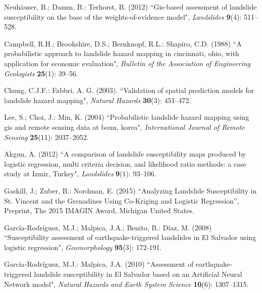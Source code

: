 \documentclass[11pt,twoside]{rmta2010eng}%
\begin{document}
\begin{thebibliography}{99}
  
Neuh\"auser, B.; Damm, B.: Terhorst, B. (2012)
``Gis-based assessment of landslide susceptibility on the base of the
  weights-of-evidence model", 
{\it Landslides} {\bf 9}(4): 511--528.
  
 

 

Campbell, R.H.; Brookshire, D.S.; Bernknopf, R.L.: Shapiro, C.D. (1988)
``A probabilistic approach to landslide hazard mapping in cincinnati,
  ohio, with application for economic evaluation", 
{\it Bulletin of the Association of Engineering Geologists} {\bf 25}(1): 39--56.
  


Chung, C.J.F.: Fabbri, A. G. (2003).
``Validation of spatial prediction models for landslide hazard mapping", 
{\it Natural Hazards} {\bf 30}(3): 451--472.
  


  

Lee, S.; Choi, J.: Min, K. (2004)
``Probabilistic landslide hazard mapping using gis and remote sensing
  data at boun, korea", 
{\it International Journal of Remote Sensing} {\bf 25}(11): 2037--2052.

  

Akgun, A. (2012) 
``A comparison of landslide susceptibility maps produced by logistic regression, multi criteria decision, and likelihood ratio methods: a case study at Izmir, Turkey", 
{\it Landslides} {\bf 9}(1): 93--106.
  


Gaskill, J.; Zuber, B.: Nordman, E. (2015)
``Analyzing Landslide Susceptibility in St. Vincent and the Grenadines Using Co-Kriging and Logistic Regression'', 
Preprint, The 2015 IMAGIN Award, Michigan United States.




Garc\'{i}a-Rodr\'{i}guez, M.J.; Malpica, J.A.; Benito, B.: D\'{i}az, M. (2008) 
``Susceptibility assessment of earthquake-triggered landslides in El Salvador using logistic regression", 
{\it Geomorphology} {\bf 95}(3): 172-191.

    

Garc\'{i}a-Rodr\'{i}guez, M.J.: Malpica, J.A. (2010)
``Assessment of earthquake-triggered landslide susceptibility in El Salvador based on an Artificial Neural Network model", 
{\it Natural Hazards and Earth System Science} {\bf 10}(6): 1307–1315.






\end{thebibliography}
\end{document}

